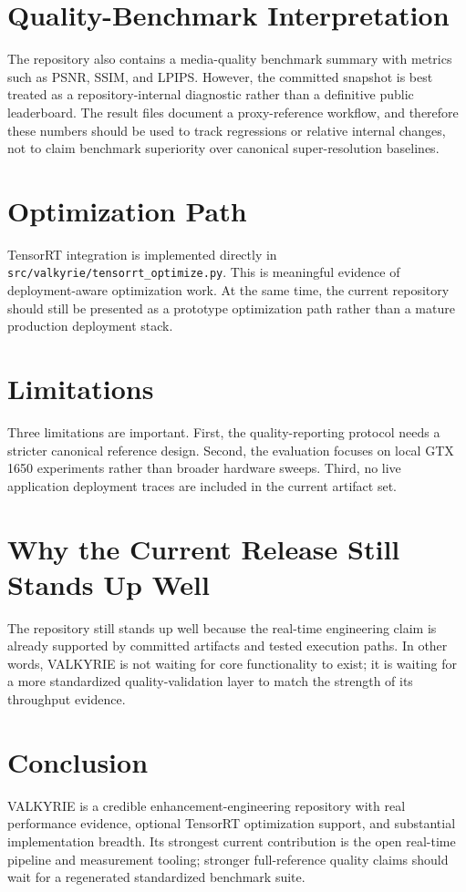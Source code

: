 \documentclass[conference]{IEEEtran}
\begin{document}
\section{Quality-Benchmark Interpretation}
The repository also contains a media-quality benchmark summary with metrics such as PSNR, SSIM, and LPIPS. However, the committed snapshot is best treated as a repository-internal diagnostic rather than a definitive public leaderboard. The result files document a proxy-reference workflow, and therefore these numbers should be used to track regressions or relative internal changes, not to claim benchmark superiority over canonical super-resolution baselines.

\section{Optimization Path}
TensorRT integration is implemented directly in \texttt{src/valkyrie/tensorrt\_optimize.py}. This is meaningful evidence of deployment-aware optimization work. At the same time, the current repository should still be presented as a prototype optimization path rather than a mature production deployment stack.

\section{Limitations}
Three limitations are important. First, the quality-reporting protocol needs a stricter canonical reference design. Second, the evaluation focuses on local GTX 1650 experiments rather than broader hardware sweeps. Third, no live application deployment traces are included in the current artifact set.

\section{Why the Current Release Still Stands Up Well}
The repository still stands up well because the real-time engineering claim is
already supported by committed artifacts and tested execution paths. In other
words, VALKYRIE is not waiting for core functionality to exist; it is waiting
for a more standardized quality-validation layer to match the strength of its
throughput evidence.

\section{Conclusion}
VALKYRIE is a credible enhancement-engineering repository with real performance evidence, optional TensorRT optimization support, and substantial implementation breadth. Its strongest current contribution is the open real-time pipeline and measurement tooling; stronger full-reference quality claims should wait for a regenerated standardized benchmark suite.



\end{document}
